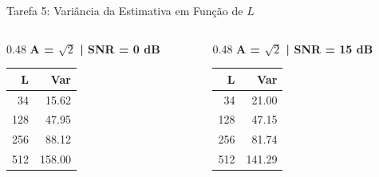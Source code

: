 \documentclass[10pt]{beamer}
\begin{document}
\begin{frame}{Tarefa 5: Variância da Estimativa em Função de $L$}
    \begin{columns}[t]
        \begin{column}{0.48\textwidth}
            \centering
            \textbf{A = $\sqrt{2}$ | SNR = 0 dB} \\ \vspace{0.1cm}
            \scriptsize
            \begin{tabular}{rr}
                \toprule
                \textbf{L} & \textbf{Var} \\
                \midrule
                34 & 15.62 \\
                128 & 47.95 \\
                256 & 88.12 \\
                512 & 158.00 \\
                \bottomrule
            \end{tabular}
        \end{column}
        
        \begin{column}{0.48\textwidth}
            \centering
            \textbf{A = $\sqrt{2}$ | SNR = 15 dB} \\ \vspace{0.1cm}
            \scriptsize
            \begin{tabular}{rr}
                \toprule
                \textbf{L} & \textbf{Var} \\
                \midrule
                34 & 21.00 \\
                128 & 47.15 \\
                256 & 81.74 \\
                512 & 141.29 \\
                \bottomrule
            \end{tabular}
        \end{column}
    \end{columns}
\end{frame}
\end{document}
